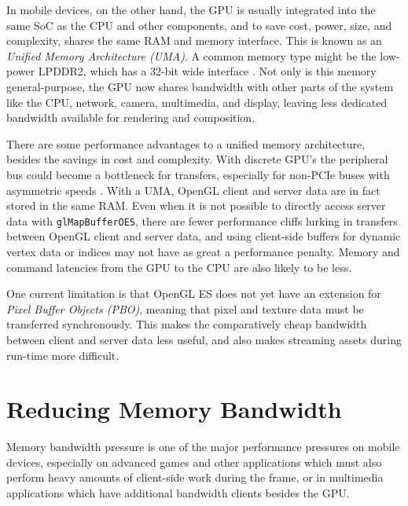 In mobile devices, on the other hand, the GPU is usually integrated into the
same SoC as the CPU and other components, and to save cost, power, size, and
complexity, shares the same RAM and memory interface.  This is known as an
\textit{Unified Memory Architecture (UMA)}.  A common memory type might be the
low-power LPDDR2, which has a 32-bit wide interface
\cite{Klug11b}.  Not only is this memory general-purpose, the GPU
now shares bandwidth with other parts of the system like the CPU, network,
camera, multimedia, and display, leaving less dedicated bandwidth 
available for rendering and composition.


There are some performance advantages to a unified memory architecture, besides
the savings in cost and complexity.  With discrete GPU's the peripheral bus
could become a bottleneck for transfers, especially for non-PCIe buses with
asymmetric speeds \cite{Elhasson05}.  With a UMA, OpenGL client and server data
are in fact stored in the same RAM.  Even when it is not possible to directly
access server data with \texttt{glMapBufferOES}, there are fewer performance
cliffs lurking in transfers between OpenGL client and server data, and using client-side buffers for dynamic vertex data or indices may not have as great a performance penalty.  Memory and command latencies from the GPU to the CPU are also likely to be less.


One current limitation is that OpenGL ES does not yet have an extension for
\textit{Pixel Buffer Objects (PBO)}, meaning that pixel and texture data must
be transferred synchronously.  This makes the comparatively cheap bandwidth
between client and server data less useful, and also makes streaming assets
during run-time more difficult.

\section{Reducing Memory
Bandwidth}\label{Jon-McCaffrey:Reducing-Memory-Bandwidth}


Memory bandwidth pressure is one of the major performance pressures on mobile
devices, especially on advanced games and other applications which must also
perform heavy amounts of client-side work during the frame, or in multimedia
applications which have additional bandwidth clients besides the GPU.

